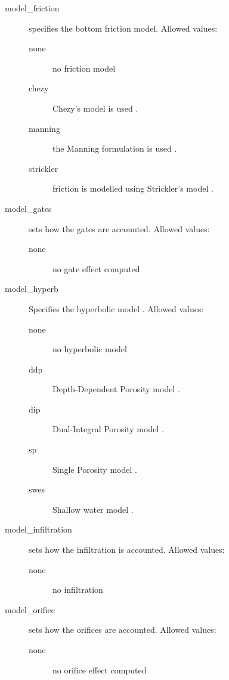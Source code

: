 \begin{description}
\item[model\_friction]  specifies the bottom friction model. Allowed values:
\begin{description}
    \item[none] no friction model
    \item[chezy]  Chezy's model is used  .
    \item[manning] the Manning formulation is used  .
    \item[strickler] friction is modelled using Strickler's model  .
\end{description}

\item[model\_gates] sets how the gates are accounted. Allowed values:
\begin{description}
    \item[none] no gate effect computed
\end{description}


\item[model\_hyperb] Specifies the hyperbolic model  . Allowed values:
\begin{description}
    \item[none] no hyperbolic model
    \item[ddp] Depth-Dependent Porosity model  .
    \item[dip] Dual-Integral Porosity model  .
    \item[sp] Single Porosity model  .
    \item[swes] Shallow water model  .
\end{description}

\item[model\_infiltration] sets how the infiltration is accounted. Allowed values:
\begin{description}
    \item[none] no infiltration
\end{description}

\item[model\_orifice] sets how the orifices are accounted. Allowed values:
\begin{description}
    \item[none] no orifice effect computed
\end{description}


\end{description}
